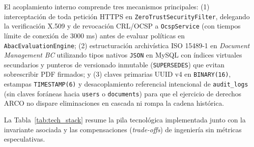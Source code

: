 \documentclass[runningheads,twocolumn]{llncs}
\begin{document}
El acoplamiento interno comprende tres mecanismos principales: (1) interceptación de toda petición HTTPS en \texttt{ZeroTrustSecurityFilter}, delegando la verificación X.509 y de revocación CRL/OCSP a \texttt{OcspService} (con tiempos límite de conexión de 3000 ms) antes de evaluar políticas en \texttt{AbacEvaluationEngine}; (2) estructuración archivística ISO 15489-1 en \textit{Document Management BC} utilizando tipos nativos \texttt{JSON} en MySQL con índices virtuales secundarios y punteros de versionado inmutable (\texttt{SUPERSEDES}) que evitan sobrescribir PDF firmados; y (3) claves primarias UUID v4 en \texttt{BINARY(16)}, estampas \texttt{TIMESTAMP(6)} y desacoplamiento referencial intencional de \texttt{audit\_logs} (sin claves foráneas hacia \texttt{users} o \texttt{documents}) para que el ejercicio de derechos ARCO no dispare eliminaciones en cascada ni rompa la cadena histórica.

La Tabla~\ref{tab:tech_stack} resume la pila tecnológica implementada junto con la invariante asociada y las compensaciones (\textit{trade-offs}) de ingeniería sin métricas especulativas.
\end{document}
